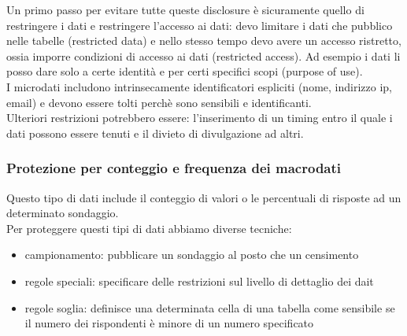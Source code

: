 Un primo passo per evitare tutte queste disclosure è sicuramente quello di restringere i dati e restringere l'accesso ai dati: devo limitare i dati che pubblico nelle tabelle (restricted data) e nello stesso tempo devo avere un accesso ristretto, ossia imporre condizioni di accesso ai dati (restricted access). Ad esempio i dati li posso dare solo a certe identità e per certi specifici scopi (purpose of use). \\
I microdati includono intrinsecamente identificatori espliciti (nome, indirizzo ip, email) e devono essere tolti perchè sono sensibili e identificanti.\\
Ulteriori restrizioni potrebbero essere: l'inserimento di un timing entro il quale i dati possono essere tenuti e il divieto di divulgazione ad altri.\\

\subsubsection{Protezione per conteggio e frequenza dei macrodati}
Questo tipo di dati include il conteggio di valori o le percentuali di risposte ad un determinato sondaggio.\\
Per proteggere questi tipi di dati abbiamo diverse tecniche:
\begin{itemize}
    \item campionamento: pubblicare un sondaggio al posto che un censimento
    \item regole speciali: specificare delle restrizioni sul livello di dettaglio dei dait
    \item regole soglia: definisce una determinata cella di una tabella come sensibile se il numero dei rispondenti è minore di un numero specificato
\end{itemize}

